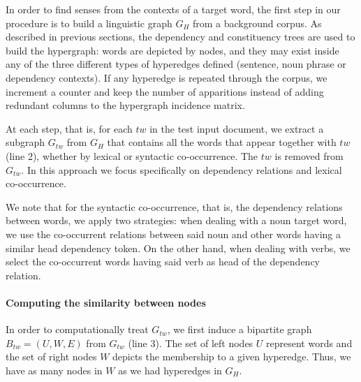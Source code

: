 
In order to find senses from the contexts of a target word, the first step in our procedure is to build a linguistic graph $G_H$ from a background corpus. As described in previous sections, the dependency and constituency trees are used to build the hypergraph: words are depicted by nodes, and they may exist inside any of the three different types of hyperedges defined (sentence,  noun phrase or dependency contexts). If any  hyperedge is repeated through the corpus, we increment a counter and keep the number of apparitions instead of adding redundant columns to the hypergraph incidence matrix.

At each step, that is, for each $tw$ in the test input document, we extract a subgraph $G_{tw}$ from $G_H$ that contains all the words that appear together with $tw$ (line 2), whether by lexical or syntactic co-occurrence. The $tw$ is removed from $G_{tw}$. In this approach we focus specifically on dependency relations and lexical co-occurrence. 

We note that for the syntactic co-occurrence, that is, the dependency relations between words, we apply two strategies: when dealing with a noun target word, we use the co-occurrent relations between said noun and other words having a similar head dependency token. On the other hand, when dealing with verbs, we select the co-occurrent words having said verb as head of the dependency relation.  

\paragraph{Computing the similarity between nodes}
In order to computationally treat $G_{tw}$, we first induce a bipartite graph $B_{tw}=(U,W,E)$ from $G_{tw}$ (line 3). The set of left nodes $U$ represent words and the set of right nodes $W$ depicts the membership to a given hyperedge. Thus, we have as many nodes in $W$  as we had hyperedges in $G_H$.

